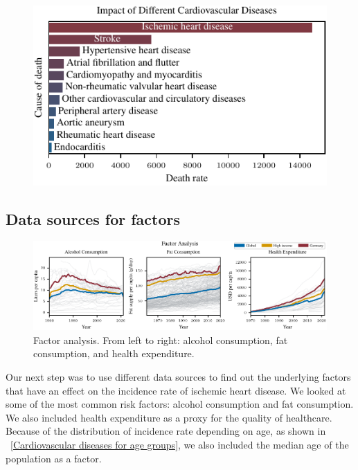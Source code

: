 \begin{figure}[ht]
    \vskip 0.2in
    \begin{center}
    \centerline{\includegraphics[width=\columnwidth]{fig/fig_ImpactOfDifferentCVDs.pdf}}
    \caption{}
    \label{Impact of Different CVDs}
    \end{center}
    \vskip -0.2in
\end{figure}

\subsection{Data sources for factors}\label{sec:data_sources}
\begin{figure}[ht]
    \vskip 0.2in
    \centering
    \centerline{\includegraphics[]{fig/fig_factor_analysis.pdf}}
    \caption{Factor analysis. From left to right: alcohol consumption, fat consumption, and health expenditure. }
    \label{Factor analysis}
\end{figure}
Our next step was to use different data sources to find out the underlying factors that have an effect on the incidence rate of ischemic heart disease. We looked at some of 
the most common risk factors: alcohol consumption and fat consumption. We also included health expenditure as a proxy for the quality of healthcare. Because of the 
distribution of incidence rate depending on age, as shown in \figurename~\ref{Cardiovascular diseases for age groups}, we also included the median age of the population as a 
factor.

